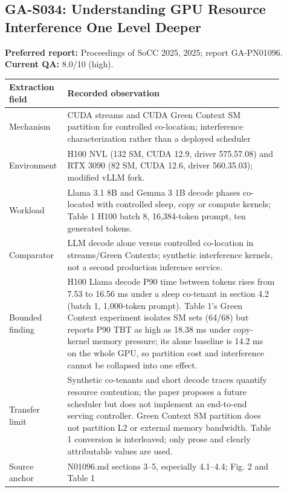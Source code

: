 \subsection{GA-S034: Understanding GPU Resource Interference One Level Deeper}
\textbf{Preferred report:} Proceedings of SoCC 2025, 2025; report GA-PN01096. \textbf{Current QA:} 8.0/10 (high).
\begin{longtable}{P{0.15\linewidth}P{0.75\linewidth}}
\toprule Extraction field & Recorded observation\\\midrule\endhead
Mechanism & CUDA streams and CUDA Green Context SM partition for controlled co-location; interference characterization rather than a deployed scheduler\\
Environment & H100 NVL (132 SM, CUDA 12.9, driver 575.57.08) and RTX 3090 (82 SM, CUDA 12.6, driver 560.35.03); modified vLLM fork.\\
Workload & Llama 3.1 8B and Gemma 3 1B decode phases co-located with controlled sleep, copy or compute kernels; Table 1 H100 batch 8, 16,384-token prompt, ten generated tokens.\\
Comparator & LLM decode alone versus controlled co-location in streams/Green Contexts; synthetic interference kernels, not a second production inference service.\\
Bounded finding & H100 Llama decode P90 time between tokens rises from 7.53 to 16.56 ms under a sleep co-tenant in section 4.2 (batch 1, 1,000-token prompt). Table 1's Green Context experiment isolates SM sets (64/68) but reports P90 TBT as high as 18.38 ms under copy-kernel memory pressure; its alone baseline is 14.2 ms on the whole GPU, so partition cost and interference cannot be collapsed into one effect.\\
Transfer limit & Synthetic co-tenants and short decode traces quantify resource contention; the paper proposes a future scheduler but does not implement an end-to-end serving controller. Green Context SM partition does not partition L2 or external memory bandwidth. Table 1 conversion is interleaved; only prose and clearly attributable values are used.\\
Source anchor & N01096.md sections 3–5, especially 4.1–4.4; Fig. 2 and Table 1\\
\bottomrule\end{longtable}
